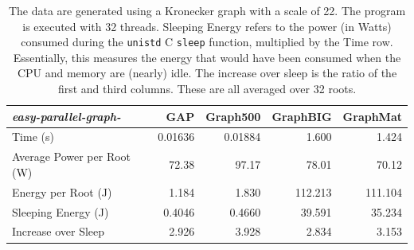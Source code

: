 \documentclass[conference]{IEEEtran}
\begin{document}
\begin{table}
	\caption{The data are generated using a Kronecker graph with a scale of 22. The program is executed with 32 threads. Sleeping Energy refers to the power (in Watts) consumed during the \texttt{unistd} C \texttt{sleep} function, multiplied by the Time row. Essentially, this measures the energy that would have been consumed when the CPU and memory are (nearly) idle. The increase over sleep is the ratio of the first and third columns. These are all averaged over 32 roots.}
	\centering
	\begin{tabular}{l|r|r|r|r}
		\large{\emph{easy-parallel-graph\mbox{-\textasteriskcentered}}}	&	GAP  &    Graph500 & GraphBIG & GraphMat \\ \hline
		Time (s) &  0.01636 & 0.01884 & 1.600 & 1.424 \\
		Average Power per Root (W) & 72.38 & 97.17 & 78.01 & 70.12 \\
		Energy per Root (J) &	1.184 & 1.830 & 112.213 & 111.104 \\
		Sleeping Energy (J) & 0.4046  & 0.4660 & 39.591 &  35.234 \\
		Increase over Sleep & 2.926 & 3.928 & 2.834 & 3.153
	\end{tabular}
	\label{tab:power}
\end{table}
\end{document}
